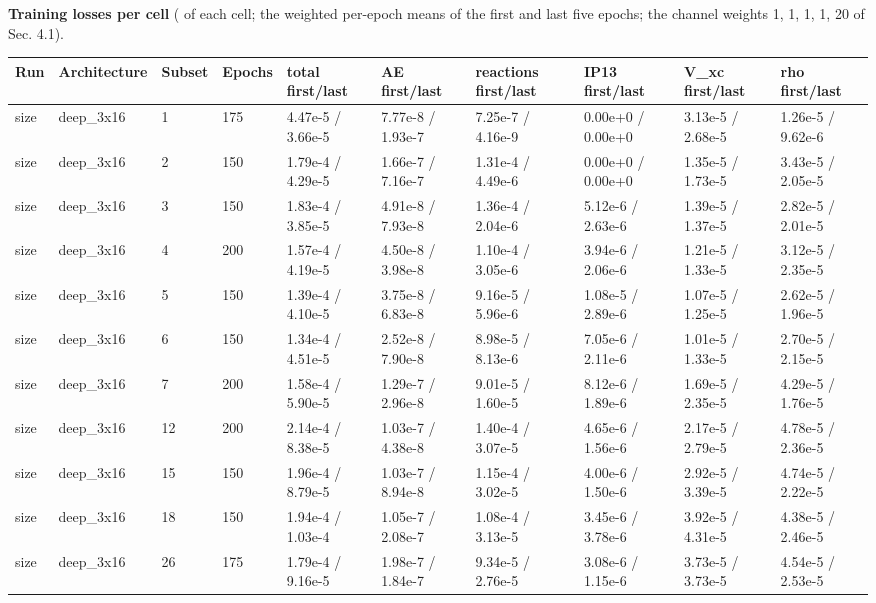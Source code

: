 \documentclass[10pt,a4paper]{article}
\begin{document}
\begin{landscape}
\textbf{Training losses per cell} ( of each cell; the weighted per-epoch means of the first and last five epochs; the channel weights 1, 1, 1, 1, 20 of Sec. 4.1).

\begin{scriptsize}
\begin{longtable}{llllllllll}
\toprule Run & Architecture & Subset & Epochs & total first/last & AE first/last & reactions first/last & IP13 first/last & V\_xc first/last & rho first/last \\ \midrule \endhead
size & deep\_3x16 & 1 & 175 & 4.47e-5 / 3.66e-5 & 7.77e-8 / 1.93e-7 & 7.25e-7 / 4.16e-9 & 0.00e+0 / 0.00e+0 & 3.13e-5 / 2.68e-5 & 1.26e-5 / 9.62e-6 \\
size & deep\_3x16 & 2 & 150 & 1.79e-4 / 4.29e-5 & 1.66e-7 / 7.16e-7 & 1.31e-4 / 4.49e-6 & 0.00e+0 / 0.00e+0 & 1.35e-5 / 1.73e-5 & 3.43e-5 / 2.05e-5 \\
size & deep\_3x16 & 3 & 150 & 1.83e-4 / 3.85e-5 & 4.91e-8 / 7.93e-8 & 1.36e-4 / 2.04e-6 & 5.12e-6 / 2.63e-6 & 1.39e-5 / 1.37e-5 & 2.82e-5 / 2.01e-5 \\
size & deep\_3x16 & 4 & 200 & 1.57e-4 / 4.19e-5 & 4.50e-8 / 3.98e-8 & 1.10e-4 / 3.05e-6 & 3.94e-6 / 2.06e-6 & 1.21e-5 / 1.33e-5 & 3.12e-5 / 2.35e-5 \\
size & deep\_3x16 & 5 & 150 & 1.39e-4 / 4.10e-5 & 3.75e-8 / 6.83e-8 & 9.16e-5 / 5.96e-6 & 1.08e-5 / 2.89e-6 & 1.07e-5 / 1.25e-5 & 2.62e-5 / 1.96e-5 \\
size & deep\_3x16 & 6 & 150 & 1.34e-4 / 4.51e-5 & 2.52e-8 / 7.90e-8 & 8.98e-5 / 8.13e-6 & 7.05e-6 / 2.11e-6 & 1.01e-5 / 1.33e-5 & 2.70e-5 / 2.15e-5 \\
size & deep\_3x16 & 7 & 200 & 1.58e-4 / 5.90e-5 & 1.29e-7 / 2.96e-8 & 9.01e-5 / 1.60e-5 & 8.12e-6 / 1.89e-6 & 1.69e-5 / 2.35e-5 & 4.29e-5 / 1.76e-5 \\
size & deep\_3x16 & 12 & 200 & 2.14e-4 / 8.38e-5 & 1.03e-7 / 4.38e-8 & 1.40e-4 / 3.07e-5 & 4.65e-6 / 1.56e-6 & 2.17e-5 / 2.79e-5 & 4.78e-5 / 2.36e-5 \\
size & deep\_3x16 & 15 & 150 & 1.96e-4 / 8.79e-5 & 1.03e-7 / 8.94e-8 & 1.15e-4 / 3.02e-5 & 4.00e-6 / 1.50e-6 & 2.92e-5 / 3.39e-5 & 4.74e-5 / 2.22e-5 \\
size & deep\_3x16 & 18 & 150 & 1.94e-4 / 1.03e-4 & 1.05e-7 / 2.08e-7 & 1.08e-4 / 3.13e-5 & 3.45e-6 / 3.78e-6 & 3.92e-5 / 4.31e-5 & 4.38e-5 / 2.46e-5 \\
size & deep\_3x16 & 26 & 175 & 1.79e-4 / 9.16e-5 & 1.98e-7 / 1.84e-7 & 9.34e-5 / 2.76e-5 & 3.08e-6 / 1.15e-6 & 3.73e-5 / 3.73e-5 & 4.54e-5 / 2.53e-5 \\

\end{longtable}
\end{scriptsize}
\end{landscape}
\end{document}
